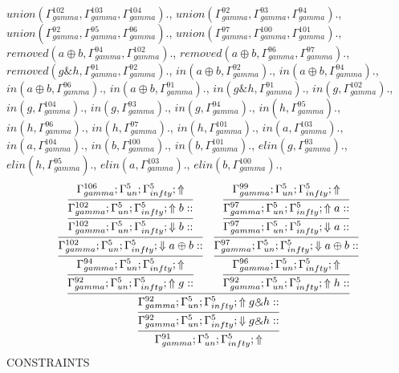 \documentclass[a4paper, 11pt]{article}
\begin{document}
$union(\Gamma_{gamma}^{102}, \Gamma_{gamma}^{103}, \Gamma_{gamma}^{104}).$, $union(\Gamma_{gamma}^{92}, \Gamma_{gamma}^{93}, \Gamma_{gamma}^{94}).$, $union(\Gamma_{gamma}^{92}, \Gamma_{gamma}^{95}, \Gamma_{gamma}^{96}).$, $union(\Gamma_{gamma}^{97}, \Gamma_{gamma}^{100}, \Gamma_{gamma}^{101}).$, $removed(a \oplus b, \Gamma_{gamma}^{94}, \Gamma_{gamma}^{102}).$, $removed(a \oplus b, \Gamma_{gamma}^{96}, \Gamma_{gamma}^{97}).$, $removed(g \binampersand h, \Gamma_{gamma}^{91}, \Gamma_{gamma}^{92}).$, $in(a \oplus b, \Gamma_{gamma}^{92}).$, $in(a \oplus b, \Gamma_{gamma}^{94}).$, $in(a \oplus b, \Gamma_{gamma}^{96}).$, $in(a \oplus b, \Gamma_{gamma}^{91}).$, $in(g \binampersand h, \Gamma_{gamma}^{91}).$, $in(g, \Gamma_{gamma}^{102}).$, $in(g, \Gamma_{gamma}^{104}).$, $in(g, \Gamma_{gamma}^{93}).$, $in(g, \Gamma_{gamma}^{94}).$, $in(h, \Gamma_{gamma}^{95}).$, $in(h, \Gamma_{gamma}^{96}).$, $in(h, \Gamma_{gamma}^{97}).$, $in(h, \Gamma_{gamma}^{101}).$, $in(a, \Gamma_{gamma}^{103}).$, $in(a, \Gamma_{gamma}^{104}).$, $in(b, \Gamma_{gamma}^{100}).$, $in(b, \Gamma_{gamma}^{101}).$, $elin(g, \Gamma_{gamma}^{93}).$, $elin(h, \Gamma_{gamma}^{95}).$, $elin(a, \Gamma_{gamma}^{103}).$, $elin(b, \Gamma_{gamma}^{100}).$, 
{\small
\[
\infer{\Gamma_{ gamma}^{91} ; \Gamma_{un}^{5} ; \Gamma_{ infty}^{5} ;  \Uparrow }
{\infer{\Gamma_{ gamma}^{92} ; \Gamma_{un}^{5} ; \Gamma_{ infty}^{5} ;  \Downarrow g \binampersand h :: }
{\infer{\Gamma_{ gamma}^{92} ; \Gamma_{un}^{5} ; \Gamma_{ infty}^{5} ;  \Uparrow g \binampersand h :: }
{\infer{\Gamma_{ gamma}^{92} ; \Gamma_{un}^{5} ; \Gamma_{ infty}^{5} ;  \Uparrow g :: }
{\infer{\Gamma_{ gamma}^{94} ; \Gamma_{un}^{5} ; \Gamma_{ infty}^{5} ;  \Uparrow }
{\infer{\Gamma_{ gamma}^{102} ; \Gamma_{un}^{5} ; \Gamma_{ infty}^{5} ;  \Downarrow a \oplus b :: }
{\infer{\Gamma_{ gamma}^{102} ; \Gamma_{un}^{5} ; \Gamma_{ infty}^{5} ;  \Downarrow b :: }
{\infer{\Gamma_{ gamma}^{102} ; \Gamma_{un}^{5} ; \Gamma_{ infty}^{5} ;  \Uparrow b :: }
{\Gamma_{ gamma}^{106} ; \Gamma_{un}^{5} ; \Gamma_{ infty}^{5} ;  \Uparrow }}}}}
&
\infer{\Gamma_{ gamma}^{92} ; \Gamma_{un}^{5} ; \Gamma_{ infty}^{5} ;  \Uparrow h :: }
{\infer{\Gamma_{ gamma}^{96} ; \Gamma_{un}^{5} ; \Gamma_{ infty}^{5} ;  \Uparrow }
{\infer{\Gamma_{ gamma}^{97} ; \Gamma_{un}^{5} ; \Gamma_{ infty}^{5} ;  \Downarrow a \oplus b :: }
{\infer{\Gamma_{ gamma}^{97} ; \Gamma_{un}^{5} ; \Gamma_{ infty}^{5} ;  \Downarrow a :: }
{\infer{\Gamma_{ gamma}^{97} ; \Gamma_{un}^{5} ; \Gamma_{ infty}^{5} ;  \Uparrow a :: }
{\Gamma_{ gamma}^{99} ; \Gamma_{un}^{5} ; \Gamma_{ infty}^{5} ;  \Uparrow }}}}}}}}
\]
}
CONSTRAINTS
\end{document}
